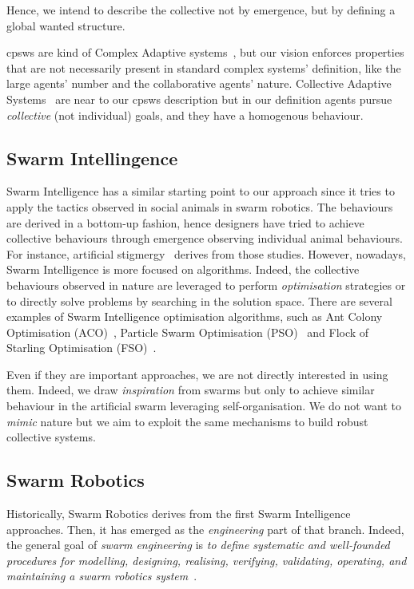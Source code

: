 \documentclass[11pt]{article}
\begin{document}
Hence, we intend to describe the collective not by emergence, but by defining a global wanted structure.

\acp{cpsw} are kind of Complex Adaptive systems~\cite{holland1992complex}, but our vision enforces properties that are not necessarily present in standard complex systems' definition, like the large agents' number and the collaborative agents' nature.
Collective Adaptive Systems~\cite{DBLP:journals/corr/abs-1108-5643} are near to our \acp{cpsw} description but in our definition agents pursue \emph{collective} (not individual) goals, and they have a homogenous behaviour.

\subsection{Swarm Intellingence}

Swarm Intelligence has a similar starting point to our approach since it tries to apply the tactics observed in social animals in swarm robotics. 
%
The behaviours are derived in a bottom-up fashion, hence designers have tried to achieve collective behaviours through emergence observing individual animal behaviours.
%
For instance, artificial stigmergy~\cite{DBLP:journals/fgcs/DorigoBT00} derives from those studies.
%
However, nowadays, Swarm Intelligence is more focused on algorithms.
% 
Indeed, the collective behaviours observed in nature are leveraged to perform \textit{optimisation} strategies or to directly solve problems by searching in the solution space.
There are several examples of Swarm Intelligence optimisation algorithms, such as Ant Colony Optimisation (ACO)~\cite{DBLP:journals/tsmc/DorigoMC96}, Particle Swarm Optimisation (PSO)~\cite{DBLP:conf/icnn/KennedyE95} and Flock of Starling Optimisation (FSO)~\cite{DBLP:series/sci/FulgineiS11}.

Even if they are important approaches, we are not directly interested in using them. 
%
Indeed, we draw \textit{inspiration} from swarms but only to achieve similar behaviour in the artificial swarm leveraging self-organisation. 
%
We do not want to \textit{mimic} nature but we aim to exploit the same mechanisms to build robust collective systems.

\subsection{Swarm Robotics}

Historically, Swarm Robotics derives from the first Swarm Intelligence approaches. 
%
Then, it has emerged as the \textit{engineering} part of that branch. 
%
Indeed, the general goal of \emph{swarm engineering} is \emph{to define systematic and well-founded procedures for modelling, designing, realising, verifying, validating, operating, and maintaining a swarm robotics system}~\cite{DBLP:journals/swarm/BrambillaFBD13}.
\end{document}
